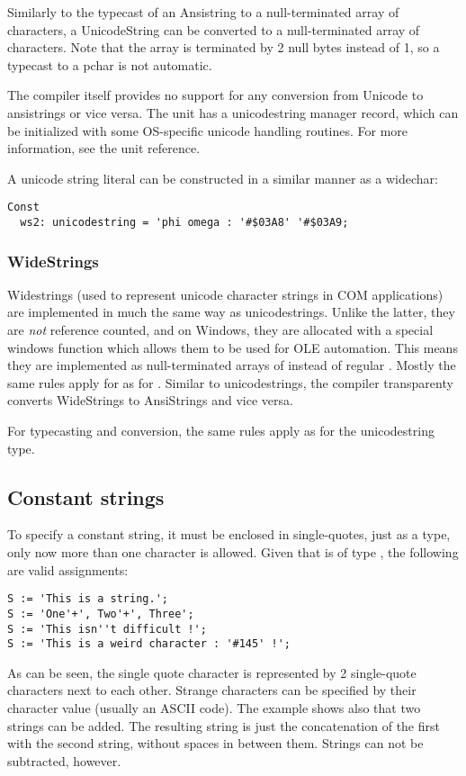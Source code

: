 Similarly to the typecast of an Ansistring to a  null-terminated
 array of characters, a UnicodeString can be converted to a 
 null-terminated array of characters. Note that the
 array is terminated by 2 null bytes instead of
1, so a typecast to a pchar is not automatic.

The compiler itself provides no support for any conversion from Unicode to
ansistrings or vice versa. The  unit has a unicodestring manager
record, which can be initialized with some OS-specific unicode handling
routines. For more information, see the  unit reference.

A unicode string literal can be constructed in a similar manner as a widechar:
\begin{verbatim}
Const
  ws2: unicodestring = 'phi omega : '#$03A8' '#$03A9;
\end{verbatim}


\subsubsection{WideStrings}
Widestrings (used to represent unicode character strings in COM applications)
are implemented in much the same way as unicodestrings. Unlike the latter,
they are \emph{not} reference counted, and on Windows, they are allocated with a
special windows function which allows them to be used for OLE automation.
This means they are implemented as null-terminated arrays of  
instead of regular . 
Mostly the same rules apply for  as for . 
Similar to unicodestrings, the compiler transparenty converts WideStrings 
to AnsiStrings and vice versa. 

For typecasting and conversion, the same rules apply as for the
unicodestring type.

\subsection{Constant strings}
To specify a constant string, it must be enclosed in single-quotes, just
as a  type, only now more than one character is allowed.
Given that  is of type , the following are valid assignments:
\begin{verbatim}
S := 'This is a string.';
S := 'One'+', Two'+', Three';
S := 'This isn''t difficult !';
S := 'This is a weird character : '#145' !';
\end{verbatim}
As can be seen, the single quote character is represented by 2 single-quote
characters next to each other. Strange characters can be specified by their
character value (usually an ASCII code).
The example shows also that two strings can be added. The resulting string is
just the concatenation of the first with the second string, without spaces in
between them. Strings can not be subtracted, however.

